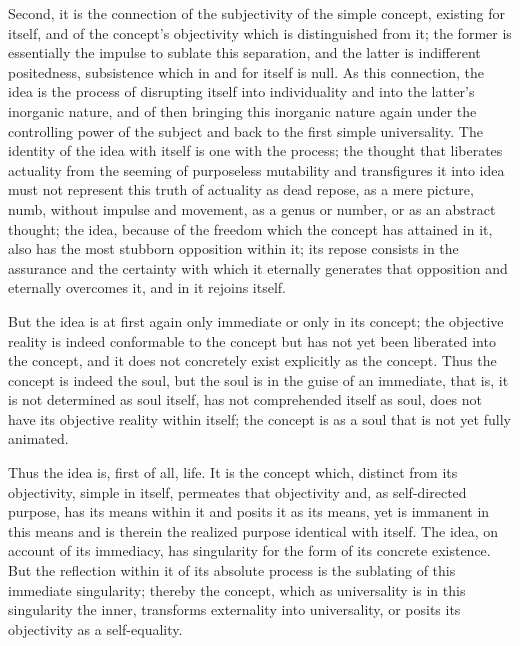 Second, it is the connection of the subjectivity
of the simple concept, existing for itself,
and of the concept's objectivity which is distinguished from it;
the former is essentially the impulse to sublate this separation,
and the latter is indifferent positedness,
subsistence which in and for itself is null.
As this connection, the idea is
the process of disrupting itself into individuality
and into the latter's inorganic nature,
and of then bringing this inorganic nature again
under the controlling power of the subject
and back to the first simple universality.
The identity of the idea with itself is one with the process;
the thought that liberates actuality from
the seeming of purposeless mutability
and transfigures it into idea
must not represent this truth of actuality
as dead repose, as a mere picture, numb, without impulse and movement,
as a genus or number, or as an abstract thought;
the idea, because of the freedom which the concept has attained in it,
also has the most stubborn opposition within it;
its repose consists in the assurance and the certainty
with which it eternally generates that opposition
and eternally overcomes it, and in it rejoins itself.

But the idea is at first again only immediate or only in its concept;
the objective reality is indeed conformable to the concept
but has not yet been liberated into the concept,
and it does not concretely exist explicitly as the concept.
Thus the concept is indeed the soul,
but the soul is in the guise of an immediate,
that is, it is not determined as soul itself,
has not comprehended itself as soul,
does not have its objective reality within itself;
the concept is as a soul that is not yet fully animated.

Thus the idea is, first of all, life.
It is the concept which, distinct from its objectivity,
simple in itself, permeates that objectivity
and, as self-directed purpose, has its means within it
and posits it as its means, yet is immanent in this means
and is therein the realized purpose identical with itself.
The idea, on account of its immediacy, has singularity
for the form of its concrete existence.
But the reflection within it of its absolute process is
the sublating of this immediate singularity;
thereby the concept, which as universality is
in this singularity the inner,
transforms externality into universality,
or posits its objectivity as a self-equality.

